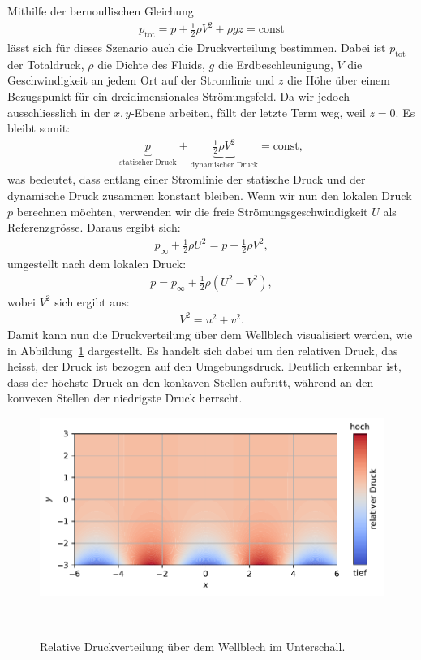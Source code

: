 Mithilfe der bernoullischen Gleichung~\cite{BernoulliWikiDE}
%
\begin{align*}
    p_{\text{tot}} 
    = 
    p 
    + 
    \frac{1}{2} \rho V^2 
    + 
    \rho g z 
    = \text{const}
\end{align*}
lässt sich für dieses Szenario auch die Druckverteilung bestimmen.
Dabei ist $p_{\text{tot}}$ der Totaldruck, 
$\rho$ die Dichte des Fluids, $g$ die Erdbeschleunigung,
$V$ die Geschwindigkeit an jedem Ort auf der Stromlinie 
und $z$ die Höhe über einem Bezugspunkt 
für ein dreidimensionales Strömungsfeld.
Da wir jedoch ausschliesslich in der $x,y$-Ebene arbeiten, 
fällt der letzte Term weg, weil $z = 0$.
Es bleibt somit:
\begin{align*}
    \underbrace{p}_{\text{statischer Druck}} 
    + 
    \underbrace{\frac{1}{2} \rho V^2}_{\text{dynamischer Druck}} 
    = 
    \text{const},
\end{align*}
was bedeutet, dass entlang einer Stromlinie 
der statische Druck und der dynamische Druck
%
%
%
%
zusammen konstant bleiben.
Wenn wir nun den lokalen Druck $p$ berechnen möchten, 
verwenden wir die freie Strömungsgeschwindigkeit $U$
als Referenzgrösse. 
Daraus ergibt sich:
\begin{align*}
    p_\infty 
    + 
    \frac{1}{2} \rho U^2 
    = 
    p 
    + 
    \frac{1}{2} \rho V^2,
\end{align*}
umgestellt nach dem lokalen Druck:
\begin{align*}
    p = p_\infty + \frac{1}{2} \rho (U^2 - V^2),
\end{align*}
wobei $V^2$ sich ergibt aus:
\begin{align*}
    V^2 = u^2 + v^2.
\end{align*}
Damit kann nun die Druckverteilung über dem Wellblech visualisiert werden, 
wie in Abbildung~\ref{fig:druckverteilung} dargestellt. 
Es handelt sich dabei um den relativen Druck, 
das heisst, der Druck ist bezogen auf den Umgebungsdruck. 
Deutlich erkennbar ist, dass der höchste Druck an den konkaven Stellen auftritt, 
während an den konvexen Stellen der niedrigste Druck herrscht.
\begin{figure}
    \centering
    \includegraphics[width=\textwidth]{papers/ueberschall/figures/Druckverteilung.pdf}
    \caption{Relative Druckverteilung über dem Wellblech im Unterschall.}
    ~\label{fig:druckverteilung}  
\end{figure}

